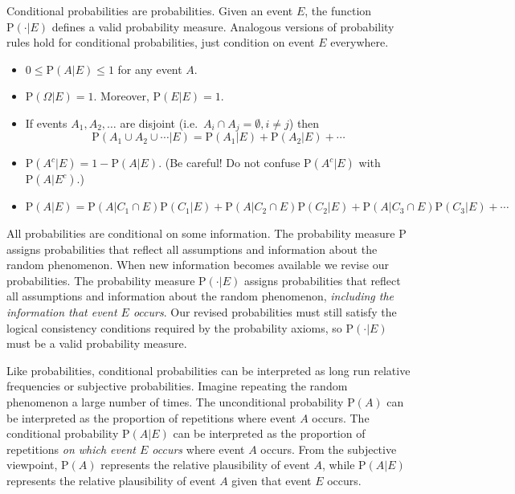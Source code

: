 \documentclass[
  letterpaper,
  DIV=11,
  numbers=noendperiod]{scrreprt}
\providecommand{\tightlist}{%
  \setlength{\itemsep}{0pt}\setlength{\parskip}{0pt}}
\theoremstyle{plain}
\theoremstyle{definition}
\theoremstyle{definition}
\theoremstyle{definition}
\theoremstyle{remark}
\begin{document}
Conditional probabilities are probabilities. Given an event \(E\), the
function \(\textrm{P}(\cdot|E)\) defines a valid probability measure.
Analogous versions of probability rules hold for conditional
probabilities, just condition on event \(E\) everywhere.

\begin{itemize}
\tightlist
\item
  \(0 \le \textrm{P}(A|E) \le 1\) for any event \(A\).
\item
  \(\textrm{P}(\Omega|E)=1\). Moreover, \(\textrm{P}(E|E) = 1\).
\item
  If events \(A_1, A_2, \ldots\) are disjoint
  (i.e.~\(A_i \cap A_j = \emptyset, i\neq j\)) then \[
  \textrm{P}(A_1 \cup A_2 \cup \cdots |E) = \textrm{P}(A_1|E) + \textrm{P}(A_2|E) + \cdots
  \]
\item
  \(\textrm{P}(A^c|E) = 1-\textrm{P}(A|E)\). (Be careful! Do not confuse
  \(\textrm{P}(A^c|E)\) with \(\textrm{P}(A|E^c)\).)
\item
  \(\textrm{P}(A|E) = \textrm{P}(A |C_1\cap E)\textrm{P}(C_1| E) + \textrm{P}(A | C_2\cap E)\textrm{P}(C_2|E) + \textrm{P}(A | C_3\cap E)\textrm{P}(C_3|E) + \cdots\)
\end{itemize}

All probabilities are conditional on some information. The probability
measure \(\textrm{P}\) assigns probabilities that reflect all
assumptions and information about the random phenomenon. When new
information becomes available we revise our probabilities. The
probability measure \(\textrm{P}(\cdot |E)\) assigns probabilities that
reflect all assumptions and information about the random phenomenon,
\emph{including the information that event \(E\) occurs}. Our revised
probabilities must still satisfy the logical consistency conditions
required by the probability axioms, so \(\textrm{P}(\cdot |E)\) must be
a valid probability measure.

Like probabilities, conditional probabilities can be interpreted as long
run relative frequencies or subjective probabilities. Imagine repeating
the random phenomenon a large number of times. The unconditional
probability \(\textrm{P}(A)\) can be interpreted as the proportion of
repetitions where event \(A\) occurs. The conditional probability
\(\textrm{P}(A|E)\) can be interpreted as the proportion of repetitions
\emph{on which event \(E\) occurs} where event \(A\) occurs. From the
subjective viewpoint, \(\textrm{P}(A)\) represents the relative
plausibility of event \(A\), while \(\textrm{P}(A|E)\) represents the
relative plausibility of event \(A\) given that event \(E\) occurs.
\end{document}
